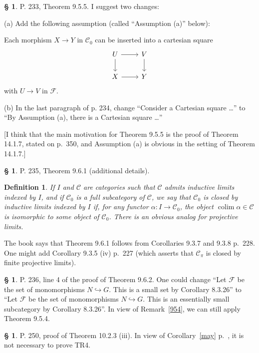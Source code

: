 \documentclass[12pt]{article}
\newtheorem{df}[thm]{Definition}%
\theoremstyle{remark}
\theoremstyle{definition}
\newtheorem{s}[thm]{\S}
\newcommand{\cc}{\mathcal}
\newcommand{\C}{\mathcal C}
\newcommand{\incl}{\hookrightarrow}
\DeclareMathOperator*{\co}{colim}
\begin{document}
%
%
\begin{s}\label{t955} 
P. 233, Theorem 9.5.5. I suggest two changes: 

\noindent(a) Add the following assumption (called ``Assumption (a)'' below): 

Each morphism $X\to Y$ in $\C_0$ can be inserted into a cartesian square
$$
\begin{tikzcd}
U\ar{r}\ar{d}&V\ar{d}\\ X\ar{r}&Y
\end{tikzcd}
$$ 
with $U\to V$ in $\cc F$. 

\noindent(b) In the last paragraph of p. 234, change ``Consider a Cartesian square \dots'' to ``By Assumption (a), there is a Cartesian square \dots'' 

[I think that the main motivation for Theorem 9.5.5 is the proof of Theorem 14.1.7, stated on p.~350, and Assumption (a) is obvious in the setting of Theorem 14.1.7.] 
\end{s}
%
%
\begin{s} 
P. 235, Theorem 9.6.1 (additional details).
%
\begin{df}\label{cb}
If $I$ and $\C$ are categories such that $\C$ admits inductive limits indexed by $I$, and if $\C_0$ is a full subcategory of $\C$, we say that $\C_0$ is {\em closed by inductive limits indexed by} $I$ if, for any functor $\alpha:I\to\C_0$, the object $\co\alpha\in\C$ is isomorphic to some object of $\C_0$. There is an obvious analog for projective limits.
\end{df}

The book says that Theorem 9.6.1 follows from Corollaries 9.3.7 and 9.3.8 p.~228. One might add Corollary 9.3.5 (iv) p.~227 (which asserts that $\C_\pi$ is closed by finite projective limits).
\end{s}
%
%
\begin{s} 
P. 236, line 4 of the proof of Theorem 9.6.2. One could change ``Let $\cc F$ be the set of monomorphisms $N\incl G$. This is a small set by Corollary 8.3.26'' to ``Let $\cc F$ be the set of monomorphisms $N\incl G$. This is an essentially small subcategory by Corollary 8.3.26''. In view of Remark~\ref{954}, we can still apply Theorem 9.5.4.
\end{s}
%
%
\begin{s} 
P. 250, proof of Theorem 10.2.3 (iii). In view of Corollary~\ref{may} p.~\pageref{may}, it is not necessary to prove TR4.
\end{s}
%
%
\end{document}
